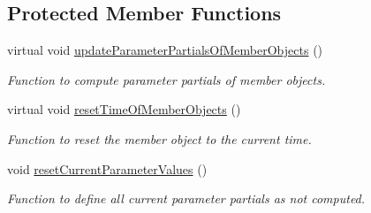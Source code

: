 \subsection*{Protected Member Functions}
\begin{DoxyCompactItemize}
\item 
virtual void \hyperlink{classtudat_1_1orbit__determination_1_1StateDerivativePartial_a53491f7d5c94bd64b71c5190b9793a64}{update\+Parameter\+Partials\+Of\+Member\+Objects} ()
\begin{DoxyCompactList}\small\item\em Function to compute parameter partials of member objects. \end{DoxyCompactList}\item 
virtual void \hyperlink{classtudat_1_1orbit__determination_1_1StateDerivativePartial_aa0245f5f6b58423905b64709dac39a4c}{reset\+Time\+Of\+Member\+Objects} ()
\begin{DoxyCompactList}\small\item\em Function to reset the member object to the current time. \end{DoxyCompactList}\item 
void \hyperlink{classtudat_1_1orbit__determination_1_1StateDerivativePartial_a7b26a08bb4990220a7d2f40f3681274a}{reset\+Current\+Parameter\+Values} ()\hypertarget{classtudat_1_1orbit__determination_1_1StateDerivativePartial_a7b26a08bb4990220a7d2f40f3681274a}{}\label{classtudat_1_1orbit__determination_1_1StateDerivativePartial_a7b26a08bb4990220a7d2f40f3681274a}

\begin{DoxyCompactList}\small\item\em Function to define all current parameter partials as \textquotesingle{}not computed\textquotesingle{}. \end{DoxyCompactList}\end{DoxyCompactItemize}
